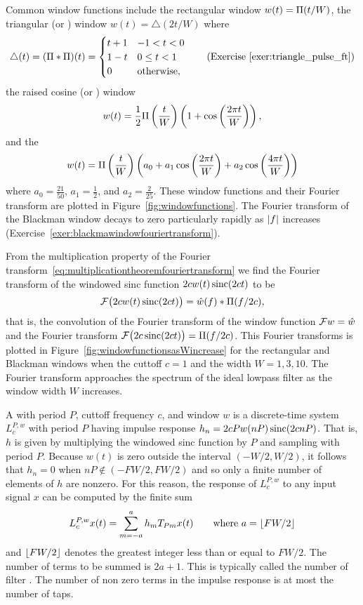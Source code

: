 Common window functions include the rectangular window $w(t) = \Pi(t/W)$, the triangular (or ) window $w(t) = \bigtriangleup(2t/W)$ where 
\[
\bigtriangleup(t) = (\Pi * \Pi)(t)  = \begin{cases}
t + 1 & -1 < t < 0 \\
1 - t & 0 \leq t < 1 \\
0 & \text{otherwise}, 
\end{cases} \qquad \text{(Exercise~\ref{exer:triangle_pulse_ft})}
\]
the raised cosine (or ) window
\[
w(t)  = \frac{1}{2} \Pi\left(\frac{t}{W}\right)\left( 1 + \cos\left(\frac{2\pi t}{W}\right) \right),
\]
and the ~\citep{BlackmanTukeywindows}
\begin{equation}\label{eq:blackmanwindow}
w(t) = \Pi\left(\frac{t}{W}\right) \left( a_0 + a_1 \cos\left(\frac{2\pi t}{W}\right) + a_2 \cos\left(\frac{4\pi t}{W}\right) \right) 
\end{equation}
where $a_0 = \tfrac{21}{50}$, $a_1 = \tfrac{1}{2}$, and $a_2 = \tfrac{2}{25}$.  These window functions and their Fourier transform are plotted in Figure~\ref{fig:windowfunctions}.  The Fourier transform of the Blackman window decays to zero particularly rapidly as $\left\vert f \right\vert$ increases (Exercise~\ref{exer:blackmawindowfouriertransform}).

From the multiplication property of the Fourier transform~\eqref{eq:multiplicationtheoremfouriertransform} we find the Fourier transform of the windowed sinc function $2c w(t) \operatorname{sinc}(2ct)$ to be
\[
{\mathcal F}\big( 2c w(t) \operatorname{sinc}(2ct)  \big) = \hat{w}(f) * \Pi(f/2c),
\]
that is, the convolution of the Fourier transform of the window function ${\mathcal F} w = \hat{w}$ and the Fourier transform ${\mathcal F}\big( 2c\operatorname{sinc}(2ct) \big) = \Pi(f/2c)$.
This Fourier transforms is plotted in Figure~\ref{fig:windowfunctionsasWincrease} for the rectangular and Blackman windows when the cuttoff $c = 1$ and the width $W=1,3,10$.  The Fourier transform approaches the spectrum of the ideal lowpass filter as the window width $W$ increases.

A  with period $P$, cuttoff frequency $c$, and window $w$ is a discrete-time system $L_c^{P,w}$ with period $P$ having impulse response $h_n = 2c P w(nP) \operatorname{sinc}(2c nP)$.  That is, $h$ is given by multiplying the windowed sinc function by $P$ and sampling with period $P$.  Because $w(t)$ is zero outside the interval $(-W/2, W/2)$, it follows that $h_n = 0$ when $n P \notin (-FW/2, FW/2)$ and so only a finite number of elements of $h$ are nonzero.  For this reason, the response of $L_c^{P,w}$ to any input signal $x$ can be computed by the finite sum
\begin{equation}\label{eq:firfilterfinitesum}
L_c^{P,w}x(t) = \sum_{m = -a}^a h_m T_{Pm}x(t) \qquad \text{where $a = {\left\lfloor FW/2 \right\rfloor}$}
\end{equation}
and ${\left\lfloor FW/2 \right\rfloor}$ denotes the greatest integer less than or equal to $FW/2$.  The number of terms to be summed is $2a + 1$.  This is typically called the number of filter .  The number of non zero terms in the impulse response is at most the number of taps.  

